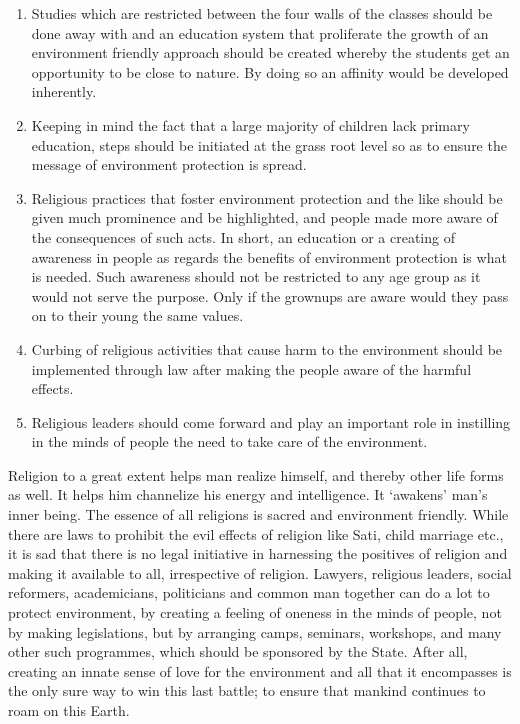 \begin{multicols}{2}
\begin{enumerate}[label=$\bullet$]
\item Studies which are restricted between the four walls of the classes should be done away
with and an education system that proliferate the growth of an environment friendly
approach should be created whereby the students get an opportunity to be close to
nature. By doing so an affinity would be developed inherently.

\item Keeping in mind the fact that a large majority of children lack primary education, steps
should be initiated at the grass root level so as to ensure the message of environment
protection is spread.

\item Religious practices that foster environment protection and the like should be given
much prominence and be highlighted, and people made more aware of the
consequences of such acts. In short, an education or a creating of awareness in people
as regards the benefits of environment protection is what is needed. Such awareness
should not be restricted to any age group as it would not serve the purpose. Only if the
grownups are aware would they pass on to their young the same values.

\item Curbing of religious activities that cause harm to the environment should be implemented through law after making the people aware of the harmful effects.

\item Religious leaders should come forward and play an important role in instilling in the
minds of people the need to take care of the environment.
\end{enumerate}

\vspace{-.2cm}


\noi
Religion to a great extent helps man realize himself, and thereby other life forms as well. It
helps him channelize his energy and intelligence. It ‘awakens’ man’s inner being. The essence
of all religions is sacred and environment friendly. While there are laws to prohibit the evil
effects of religion like Sati, child marriage etc., it is sad that there is no legal initiative in
harnessing the positives of religion and making it available to all, irrespective of religion.
Lawyers, religious leaders, social reformers, academicians, politicians and common man
together can do a lot to protect environment, by creating a feeling of oneness in the minds of
people, not by making legislations, but by arranging camps, seminars, workshops, and many
other such programmes, which should be sponsored by the State. After all, creating an innate
sense of love for the environment and all that it encompasses is the only sure way to win this
last battle; to ensure that mankind continues to roam on this Earth.
\end{multicols}
	

